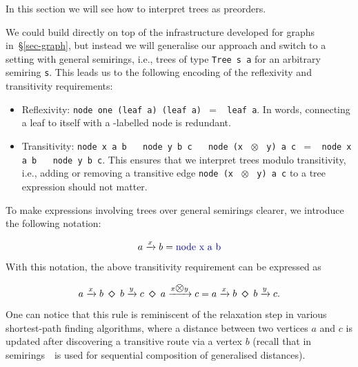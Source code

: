 \documentclass[english,submission]{programming}
\newcommand{\hcode}[1]{{\color{darkblue} \lstinline[keywordstyle={}]|#1|}} %
\newcommand{\hmul}{{\large\color{darkblue} $\otimes$}}
\newcommand{\hdia}{\,\text{\raisebox{-0.2mm}{\Large\color{darkblue} $\diamond$}}\,}
\newcommand{\mul}{\text{\raisebox{-0.1mm}{\large $\otimes$}}}
\newcommand{\one}{\raisebox{-0.2mm}{\textcircled{1}}\xspace}
\newcommand{\dia}{\,\text{\raisebox{-0.3mm}{\Large $\diamond$}}\,}
\begin{document}
\noindent
In this section we will see how to interpret trees as preorders.

\newpage
\noindent
We could build directly on top of the infrastructure developed for graphs
in~\S\ref{sec-graph}, but instead we will generalise our approach and switch to
a setting with general semirings, i.e., trees of type \hcode{Tree s a} for an
arbitrary semiring \hcode{s}. This leads us to the following encoding of the
reflexivity and transitivity requirements:

\begin{itemize}
    \item Reflexivity: \hcode{node one (leaf a) (leaf a)}~$=$~\hcode{leaf a}. In
    words, connecting a leaf to itself with a \one-labelled node is redundant.
    \item Transitivity:
    \hcode{node x a b}~\hdia~\hcode{node y b c}~\hdia~\hcode{node (x}~\hmul~\hcode{y) a c}~$=$~\hcode{node x a b}~\hdia~\hcode{node y b c}.
    This ensures that we interpret trees modulo transitivity, i.e., adding or
    removing a transitive edge \hcode{node (x}~\hmul~\hcode{y) a c} to a tree
    expression should not matter.
\end{itemize}

\noindent
To make expressions involving trees over general semirings clearer, we introduce
the following notation:

\vspace{-5mm}
\begin{equation*}
a \xrightarrow{x} b = \text{\hcode{node x a b}}
\end{equation*}
\vspace{-5mm}

\noindent
With this notation, the above transitivity requirement can be expressed as

\vspace{-5mm}
\begin{equation*}
a \xrightarrow{x} b\ \dia\ b \xrightarrow{y} c\ \dia\ a \xrightarrow{x \mul y} c = a \xrightarrow{x} b\ \dia\ b \xrightarrow{y} c.
\end{equation*}
\vspace{-5mm}

\noindent
One can notice that this rule is reminiscent of the relaxation step in various
shortest-path finding algorithms, where a distance between two vertices $a$ and
$c$ is updated after discovering a transitive route via a vertex $b$ (recall
that in semirings~\mul~is used for sequential composition of generalised
distances).
\end{document}
